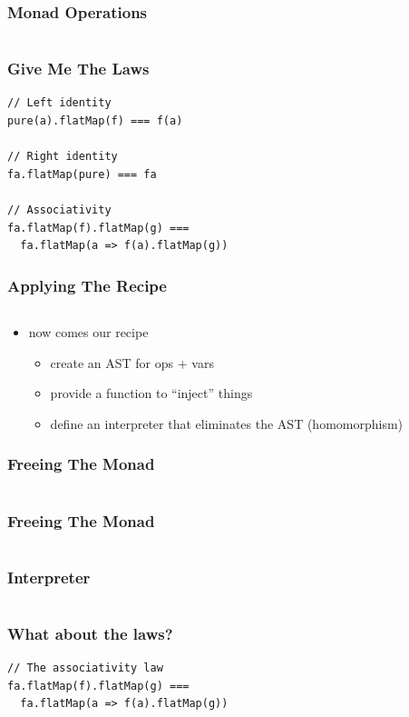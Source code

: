\documentclass{beamer}
\newcommand{\recipe}{%
  \begin{itemize}
  \item create an AST for ops + vars
  \item provide a function to ``inject'' things
  \item define an interpreter that eliminates the AST (homomorphism)
  \end{itemize}
}
\begin{document}
\begin{frame}[fragile]
  \frametitle{Monad Operations}
  \begin{center}
    \inputminted{scala}{snippets/monad-typeclass.scala}
  \end{center}
\end{frame}

\begin{frame}[fragile]
  \frametitle{Give Me The Laws}
    \begin{center}
\begin{verbatim}
// Left identity
pure(a).flatMap(f) === f(a)

// Right identity
fa.flatMap(pure) === fa

// Associativity
fa.flatMap(f).flatMap(g) ===
  fa.flatMap(a => f(a).flatMap(g))
\end{verbatim}
    \end{center}
\end{frame}

\begin{frame}[fragile]
  \frametitle{Applying The Recipe}
  \begin{center}
    \inputminted{scala}{snippets/monad-typeclass.scala}
  \end{center}
  \begin{itemize}
  \item now comes our recipe
    \recipe{}
  \end{itemize}
\end{frame}

\begin{frame}[fragile]
  \frametitle{Freeing The Monad}
  \begin{center}
    \inputminted{scala}{snippets/free-monad.scala}
  \end{center}
\end{frame}

\begin{frame}[fragile]
  \frametitle{Freeing The Monad}
  \begin{center}
    \inputminted{scala}{snippets/free-instance.scala}
  \end{center}
\end{frame}

\begin{frame}[fragile]
  \frametitle{Interpreter}
  \inputminted{scala}{snippets/free-interp.scala}
\end{frame}

\begin{frame}[fragile]
  \frametitle{What about the laws?}
  \begin{verbatim}
// The associativity law
fa.flatMap(f).flatMap(g) ===
  fa.flatMap(a => f(a).flatMap(g))
  \end{verbatim}
  \vfill{}
  \inputminted[autogobble]{scala}{snippets/what-about-laws.scala}
\end{frame}
\end{document}
